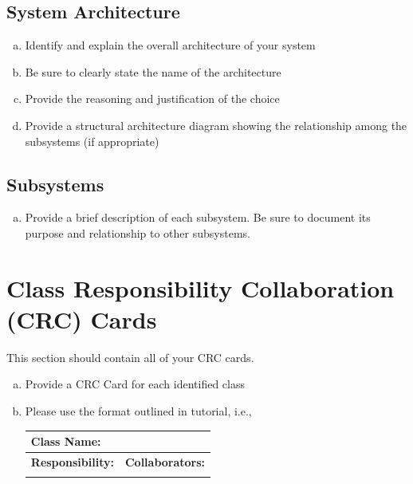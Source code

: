 \documentclass[titlepage]{article}
\begin{document}
\subsection{System Architecture}
\label{sub:system_architecture}
\begin{enumerate}[a)]
    \item Identify and explain the overall architecture of your system
    \item Be sure to clearly state the name of the architecture
    \item Provide the reasoning and justification of the choice
    \item Provide a structural architecture diagram showing the relationship among the subsystems
    (if appropriate)
\end{enumerate}

\subsection{Subsystems}
\label{sub:subsystems}
\begin{enumerate}[a)]
    \item Provide a brief description of each subsystem. Be sure to document its purpose and
    relationship to other subsystems.
\end{enumerate}

    
\section{Class Responsibility Collaboration (CRC) Cards}
\label{sec:class_responsibility_collaboration_crc_cards}
This section should contain all of your CRC cards.

\begin{enumerate}[a)]
    \item Provide a CRC Card for each identified class
    \item Please use the format outlined in tutorial, i.e., 
    \begin{table}[ht]
        \centering
        \begin{tabular}{|p{5cm}|p{5cm}|}
        \hline 
        \multicolumn{2}{|l|}{\textbf{Class Name:}} \\
        \hline
        \textbf{Responsibility:} & \textbf{Collaborators:} \\
        \hline
        \vspace{1in} & \\
        \hline
        \end{tabular}
    \end{table}
    
\end{enumerate}
\end{document}

